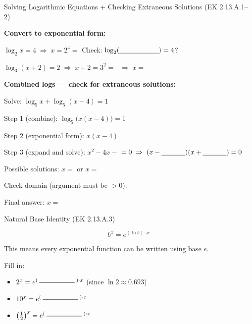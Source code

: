 \documentclass[10pt]{article}
\begin{document}
\begin{notesbox}{Solving Logarithmic Equations + Checking Extraneous Solutions (EK 2.13.A.1--2)}

\textbf{Convert to exponential form:}

\vspace{4pt}
$\log_2 x = 4 \;\Rightarrow\; x = 2^4 = $ \blank{2cm} \quad Check: $\log_2(\blank{2cm}) = 4$? \blank{1.5cm}

\vspace{8pt}
$\log_3(x+2) = 2 \;\Rightarrow\; x+2 = 3^2 = $ \blank{2cm} $\;\Rightarrow\; x = $ \blank{2cm}

\vspace{10pt}
\textbf{Combined logs --- check for extraneous solutions:}

\vspace{4pt}
Solve: $\log_5 x + \log_5(x-4) = 1$

\vspace{4pt}
Step 1 (combine): $\log_5\bigl(x(x-4)\bigr) = 1$

\vspace{4pt}
Step 2 (exponential form): $x(x-4) = $ \blank{2cm}

\vspace{4pt}
Step 3 (expand and solve): $x^2 - 4x - $ \blank{1.5cm} $= 0 \;\Rightarrow\; (x - \blank{1.2cm})(x + \blank{1.2cm}) = 0$

\vspace{4pt}
Possible solutions: $x = $ \blank{1.5cm} or $x = $ \blank{1.5cm}

\vspace{4pt}
Check domain (argument must be $> 0$): \writeline

\vspace{4pt}
Final answer: $x = $ \blank{2.5cm}

\end{notesbox}

\vspace{0.06in}

\begin{notesbox}{Natural Base Identity (EK 2.13.A.3)}

\[
  b^x = e^{(\ln b)\cdot x}
\]

\vspace{4pt}
This means every exponential function can be written using base $e$.

\vspace{6pt}
Fill in:
\begin{itemize}[leftmargin=1.5em,itemsep=6pt,topsep=4pt]
  \item $2^x = e^{(\;\blank{1.8cm}\;)\cdot x}$ \qquad (since $\ln 2 \approx 0.693$)
  \item $10^x = e^{(\;\blank{1.8cm}\;)\cdot x}$
  \item $\bigl(\tfrac{1}{2}\bigr)^x = e^{(\;\blank{1.8cm}\;)\cdot x}$
\end{itemize}

\end{notesbox}
\end{document}
